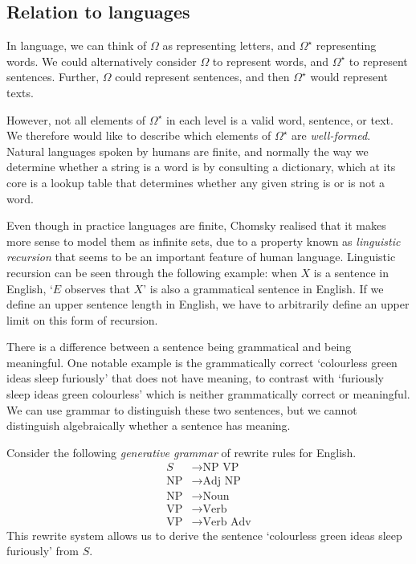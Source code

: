 \subsection{Relation to languages}
In language, we can think of \( \Omega \) as representing letters, and \( \Omega^\star \) representing words.
We could alternatively consider \( \Omega \) to represent words, and \( \Omega^\star \) to represent sentences.
Further, \( \Omega \) could represent sentences, and then \( \Omega^\star \) would represent texts.

However, not all elements of \( \Omega^\star \) in each level is a valid word, sentence, or text.
We therefore would like to describe which elements of \( \Omega^\star \) are \emph{well-formed}.
Natural languages spoken by humans are finite, and normally the way we determine whether a string is a word is by consulting a dictionary, which at its core is a lookup table that determines whether any given string is or is not a word.

Even though in practice languages are finite, Chomsky realised that it makes more sense to model them as infinite sets, due to a property known as \emph{linguistic recursion} that seems to be an important feature of human language.
Linguistic recursion can be seen through the following example: when \( X \) is a sentence in English, `\( E \) observes that \( X \)' is also a grammatical sentence in English.
If we define an upper sentence length in English, we have to arbitrarily define an upper limit on this form of recursion.

There is a difference between a sentence being grammatical and being meaningful.
One notable example is the grammatically correct `colourless green ideas sleep furiously' that does not have meaning, to contrast with `furiously sleep ideas green colourless' which is neither grammatically correct or meaningful.
We can use grammar to distinguish these two sentences, but we cannot distinguish algebraically whether a sentence has meaning.

\begin{example}
	Consider the following \emph{generative grammar} of rewrite rules for English.
	\begin{align*}
		S &\to \text{NP VP} \\
		\text{NP} &\to \text{Adj NP} \\
		\text{NP} &\to \text{Noun} \\
		\text{VP} &\to \text{Verb} \\
		\text{VP} &\to \text{Verb Adv}
	\end{align*}
	This rewrite system allows us to derive the sentence `colourless green ideas sleep furiously' from \( S \).
\end{example}

